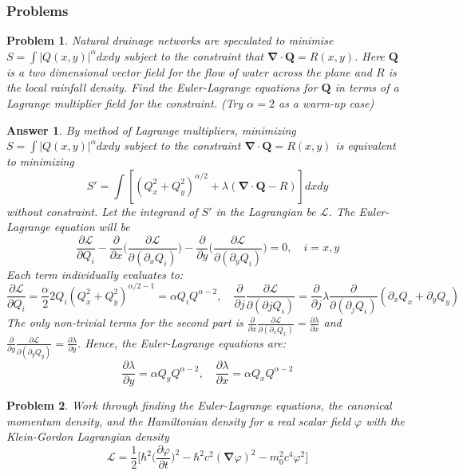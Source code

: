\documentclass[a4paper]{article}
\newtheorem{ans}{Answer}[section]
\theoremstyle{new}
\newtheorem{qns}{Problem}[section]
\begin{document}
\subsubsection{Problems}
\begin{qns}
Natural drainage networks are speculated to minimise $S=\int|Q(x,y)|^\alpha dxdy$ subject to the constraint that $\boldsymbol{\nabla}\cdot\mathbf{Q} = R(x, y)$. Here $\mathbf{Q}$ is a two dimensional vector field for the flow of water across the plane and $R$ is the local rainfall density. Find the Euler-Lagrange equations for $\mathbf{Q}$ in terms of a Lagrange multiplier field for the constraint. (Try $\alpha=2$ as a warm-up case)
\end{qns}
\begin{ans}
By method of Lagrange multipliers, minimizing $S=\int|Q(x,y)|^\alpha dxdy$ subject to the constraint $\boldsymbol{\nabla}\cdot\mathbf{Q}=R(x,y)$ is equivalent to minimizing
$$S'=\int[(Q_x^2+Q_y^2)^{\alpha/2}+\lambda(\boldsymbol{\nabla}\cdot\mathbf{Q}-R)]dxdy$$
without constraint. Let the integrand of $S'$ in the Lagrangian be $\mathcal{L}$. The Euler-Lagrange equation will be
$$\frac{\partial\mathcal{L}}{\partial Q_i}-\frac{\partial}{\partial x}\bigg(\frac{\partial\mathcal{L}}{\partial(\partial_xQ_i)}\bigg)-\frac{\partial}{\partial y}\bigg(\frac{\partial\mathcal{L}}{\partial(\partial_yQ_i)}\bigg)=0,\quad i=x,y$$
Each term individually evaluates to:
$$\frac{\partial\mathcal{L}}{\partial Q_i}=\frac{\alpha}{2}2Q_i(Q_x^2+Q_y^2)^{\alpha/2-1}=\alpha Q_iQ^{\alpha-2},\quad\frac{\partial}{\partial j}\frac{\partial\mathcal{L}}{\partial(\partial j Q_i)}=\frac{\partial}{\partial j}\lambda\frac{\partial}{\partial(\partial_jQ_i)}(\partial_xQ_x+\partial_yQ_y)$$
The only non-trivial terms for the second part is $\frac{\partial}{\partial x}\frac{\partial\mathcal{L}}{\partial(\partial_xQ_x)}=\frac{\partial\lambda}{\partial x}$ and $\frac{\partial}{\partial y}\frac{\partial\mathcal{L}}{\partial(\partial_yQ_y)}=\frac{\partial\lambda}{\partial y}$. Hence, the Euler-Lagrange equations are:
$$\frac{\partial\lambda}{\partial y}=\alpha Q_yQ^{\alpha-2},\quad\frac{\partial\lambda}{\partial x}=\alpha Q_xQ^{\alpha-2}$$
\end{ans}
\begin{qns}
Work through finding the Euler-Lagrange equations, the canonical momentum density, and the Hamiltonian density for a real scalar field $\varphi$ with the Klein-Gordon Lagrangian density
$$\mathcal{L}=\frac{1}{2}\bigg[\hbar^2\bigg(\frac{\partial\varphi}{\partial t}\bigg)^2-\hbar^2c^2(\boldsymbol{\nabla}\varphi)^2-m_0^2c^4\varphi^2\bigg]$$
\end{qns}
\end{document}
